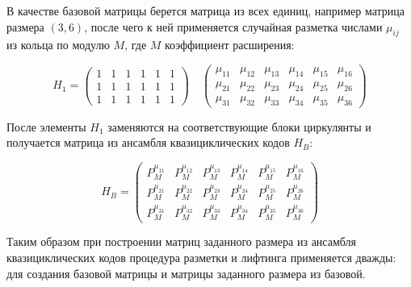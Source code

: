 В качестве базовой матрицы берется матрица из всех единиц, например матрица размера $(3,6)$,
после чего к ней применяется случайная разметка числами $\mu_{ij}$ из кольца по модулю $M$,
 где $M$ коэффициент
расширения:

\[
	H_1 = \begin{pmatrix}
		1 & 1 & 1 & 1 & 1 & 1 \\
		1 & 1 & 1 & 1 & 1 & 1 \\
		1 & 1 & 1 & 1 & 1 & 1
	\end{pmatrix}
	\quad
	\begin{pmatrix}
		\mu_{11} & \mu_{12} & \mu_{13} & \mu_{14} & \mu_{15} & \mu_{16} \\
		\mu_{21} & \mu_{22} & \mu_{23} & \mu_{24} & \mu_{25} & \mu_{26} \\
		\mu_{31} & \mu_{32} & \mu_{33} & \mu_{34} & \mu_{35} & \mu_{36}
	\end{pmatrix}
\]

После элементы $H_1$ заменяются на соответствующие блоки циркулянты и получается матрица из ансамбля
квазициклических кодов $H_B$:

\[
H_B=\begin{pmatrix}
		P^{\mu_{11}}_M & P^{\mu_{12}}_M & P^{\mu_{13}}_M & P^{\mu_{14}}_M & P^{\mu_{15}}_M & P^{\mu_{16}}_M \\
		P^{\mu_{21}}_M & P^{\mu_{22}}_M & P^{\mu_{23}}_M & P^{\mu_{24}}_M & P^{\mu_{25}}_M & P^{\mu_{26}}_M \\
		P^{\mu_{31}}_M & P^{\mu_{32}}_M & P^{\mu_{33}}_M & P^{\mu_{34}}_M & P^{\mu_{35}}_M & P^{\mu_{36}}_M
	\end{pmatrix}
\]

Таким образом при построении матриц заданного размера из ансамбля квазициклических кодов 
процедура разметки и лифтинга
применяется дважды: для создания базовой матрицы и матрицы заданного размера из базовой.

















































